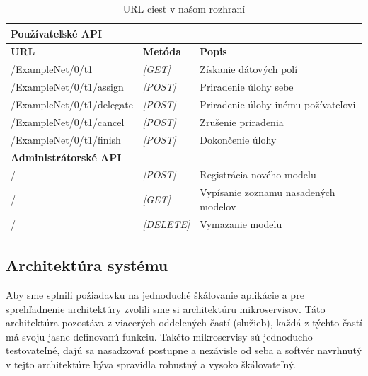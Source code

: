 \begin{table}[]
\begin{tabular}{|l|ll|}
\hline
\textbf{Používateľské API}     &                                            &                                      \\ \hline
\textbf{URL}                   & \multicolumn{1}{l|}{\textbf{Metóda}}       & \textbf{Popis}                       \\ \hline
/ExampleNet/0/t1               & \multicolumn{1}{l|}{\textit{{[}GET{]}}}    & Získanie dátových polí               \\ \hline
/ExampleNet/0/t1/assign        & \multicolumn{1}{l|}{\textit{{[}POST{]}}}   & Priradenie úlohy sebe                \\ \hline
/ExampleNet/0/t1/delegate      & \multicolumn{1}{l|}{\textit{{[}POST{]}}}   & Priradenie úlohy inému požívateľovi   \\ \hline
/ExampleNet/0/t1/cancel        & \multicolumn{1}{l|}{\textit{{[}POST{]}}}   & Zrušenie priradenia                  \\ \hline
/ExampleNet/0/t1/finish        & \multicolumn{1}{l|}{\textit{{[}POST{]}}}   & Dokončenie úlohy                     \\ \hline
\textbf{Administrátorské API} & \textit{}                                  &                                      \\ \hline
/                              & \multicolumn{1}{l|}{\textit{{[}POST{]}}}   & Registrácia nového modelu            \\ \hline
/                              & \multicolumn{1}{l|}{\textit{{[}GET{]}}}    & Vypísanie zoznamu nasadených modelov \\ \hline
/                              & \multicolumn{1}{l|}{\textit{{[}DELETE{]}}} & Vymazanie modelu                     \\ \hline
\end{tabular}
\caption{URL ciest v našom rozhraní}
\label{urls_table}
\end{table} 

\subsection{Architektúra systému}
Aby sme splnili požiadavku na jednoduché škálovanie aplikácie a pre sprehľadnenie architektúry zvolili sme si architektúru mikroservisov. Táto architektúra pozostáva z viacerých oddelených častí (služieb), každá z týchto častí má svoju jasne definovanú funkciu. Takéto mikroservisy sú jednoducho testovateľné, dajú sa nasadzovať postupne a nezávisle od seba a softvér navrhnutý v tejto architektúre býva spravidla robustný a vysoko škálovateľný.

